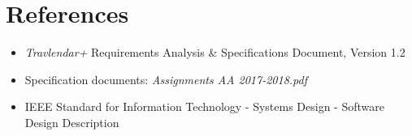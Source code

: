 \section{References}
\begin{itemize}
    \item \emph{Travlendar+} Requirements Analysis \& Specifications Document, Version 1.2
    \item Specification documents: \emph{Assignments AA 2017-2018.pdf}
    \item IEEE Standard for Information Technology - Systems Design - Software Design Description
\end{itemize}